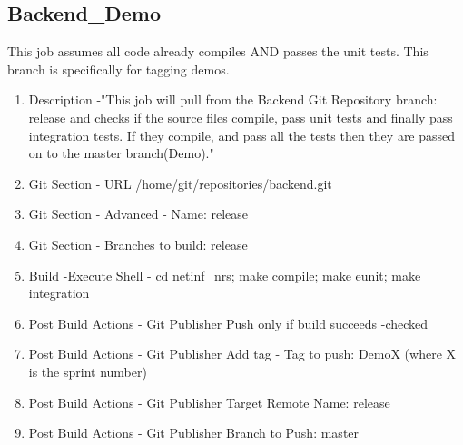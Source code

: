 \subsection{Backend\_Demo}

This job assumes all code already compiles AND passes the unit tests. This branch is specifically for tagging demos.

\begin{enumerate}
\item Description -"This job will pull from the Backend Git Repository branch: release and checks if the source files compile, pass unit tests and finally pass integration tests. If they compile, and pass all the tests then they are passed on to the master branch(Demo)."
\item Git Section - URL /home/git/repositories/backend.git
\item Git Section - Advanced - Name: release
\item Git Section - Branches to build: release
\item Build -Execute Shell - cd netinf\_nrs; make compile; make eunit; make integration
\item Post Build Actions - Git Publisher Push only if build succeeds -checked
\item Post Build Actions - Git Publisher Add tag - Tag to push: DemoX (where X is the sprint number)
\item Post Build Actions - Git Publisher Target Remote Name: release
\item Post Build Actions - Git Publisher Branch to Push: master
\end{enumerate}
